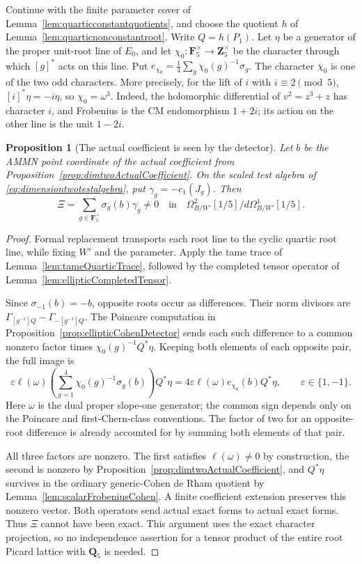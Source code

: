 \documentclass[11pt,a4paper]{article}
\newtheorem{proposition}[theorem]{Proposition}
\theoremstyle{remark}
\begin{document}
Continue with the finite parameter cover of
Lemma~\ref{lem:quarticconstantquotients}, and choose the quotient
$h$ of Lemma~\ref{lem:quarticnonconstantroot}.  Write $Q=h(P_1)$.
Let $\eta$ be a generator of the proper unit-root line of $E_0$,
and let $\chi_0:\mathbf F_5^\times\to\mathbf Z_5^\times$ be the
character through which $[g]^*$ acts on this line.  Put
$e_{\chi_0}=\frac14\sum_g\chi_0(g)^{-1}\sigma_g$.  The character $\chi_0$ is one of
the two odd characters.  More precisely, for the lift of $i$ with
$i\equiv2\pmod5$, $[i]^*\eta=-i\eta$, so $\chi_0=\omega^3$.
Indeed, the holomorphic differential of $v^2=z^3+z$ has character
$i$, and Frobenius is the CM endomorphism $1+2i$; its action on the
other line is the unit $1-2i$.

\begin{proposition}[The actual coefficient is seen by the detector]
\label{prop:dimtwoWeightedNonzero}
Let $b$ be the AMMN point coordinate of the actual coefficient
from Proposition~\ref{prop:dimtwoActualCoefficient}.  On the scaled
test algebra of \eqref{eq:dimensiontwotestalgebra}, put
$\gamma_g=-c_1(J_g)$.  Then
\[
 \Xi=\sum_{g\in\mathbf F_5^\times}\sigma_g(b)\gamma_g
 \ne0
 \quad\text{in}\quad
 \Omega^2_{B/W'}[1/5]/d\Omega^1_{B/W'}[1/5].
\]
\end{proposition}

\begin{proof}
Formal replacement transports each root line to the cyclic
quartic root line, while fixing $W'$ and the parameter.  Apply
the tame trace of Lemma~\ref{lem:tameQuarticTrace}, followed by
the completed tensor operator of
Lemma~\ref{lem:ellipticCompletedTensor}.

Since $\sigma_{-1}(b)=-b$, opposite roots occur as differences.
Their norm divisors are
$\Gamma_{[g^{-1}]Q}-\Gamma_{-[g^{-1}]Q}$.
The Poincare computation in
Proposition~\ref{prop:ellipticCohenDetector} sends each such
difference to a common nonzero factor times
$\chi_0(g)^{-1}Q^*\eta$.  Keeping both elements of each opposite
pair, the full image is
\[
 \varepsilon\ell(\omega)
  \left(\sum_{g=1}^4\chi_0(g)^{-1}\sigma_g(b)\right)Q^*\eta
   =4\varepsilon\ell(\omega)e_{\chi_0}(b)Q^*\eta,
 \qquad \varepsilon\in\{1,-1\}.
\]
Here $\omega$ is the dual proper slope-one generator; the common
sign depends only on the Poincare and first-Chern-class conventions.
The factor of two for an opposite-root difference is already
accounted for by summing both elements of that pair.

All three factors are nonzero.  The first satisfies
$\ell(\omega)\ne0$ by construction, the second is nonzero by
Proposition~\ref{prop:dimtwoActualCoefficient}, and $Q^*\eta$
survives in the ordinary generic-Cohen de Rham quotient by
Lemma~\ref{lem:scalarFrobeniusCohen}.  A finite coefficient extension
preserves this nonzero vector.  Both operators send actual exact
forms to actual exact forms.  Thus $\Xi$ cannot have been exact.
This argument uses the exact character projection, so no
independence assertion for a tensor product of the entire root
Picard lattice with $\mathbf Q_5$ is needed.
\end{proof}
\end{document}
